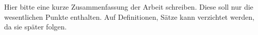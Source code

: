 
\thispagestyle{empty} 
Hier bitte eine kurze Zusammenfassung der Arbeit schreiben.
Diese soll nur die wesentlichen Punkte enthalten.
Auf Definitionen, Sätze \usw kann verzichtet werden, da sie später folgen.
\cleardoubleoddpage
